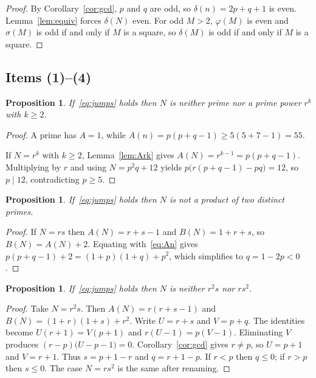 \documentclass[11pt,reqno]{amsart}
\newcommand{\ph}{\varphi}
\newcommand{\sig}{\sigma}
\newtheorem{proposition}[theorem]{Proposition}
\theoremstyle{definition}
\begin{document}
\begin{proof}
By Corollary~\ref{cor:gcd}, \(p\) and \(q\) are odd, so \(\delta(n)=2p+q+1\) is even. Lemma~\ref{lem:equiv} forces \(\delta(N)\) even. For odd \(M>2\), \(\ph(M)\) is even and \(\sig(M)\) is odd if and only if \(M\) is a square, so \(\delta(M)\) is odd if and only if \(M\) is a square.
\end{proof}

\subsection{Items (1)--(4)}

\begin{proposition}
\label{prop:primepower}
If~\eqref{eq:jumps} holds then \(N\) is neither prime nor a prime power \(r^k\) with \(k\ge 2\).
\end{proposition}

\begin{proof}
A prime has \(A=1\), while \(A(n)=p(p+q-1)\ge 5(5+7-1)=55\).

If \(N=r^k\) with \(k\ge 2\), Lemma~\ref{lem:Ark} gives \(A(N)=r^{k-1}=p(p+q-1)\). Multiplying by \(r\) and using \(N=p^2q+12\) yields \(p\bigl(r(p+q-1)-pq\bigr)=12\), so \(p\mid 12\), contradicting \(p\ge 5\).
\end{proof}

\begin{proposition}
\label{prop:rs}
If~\eqref{eq:jumps} holds then \(N\) is not a product of two distinct primes.
\end{proposition}

\begin{proof}
If \(N=rs\) then \(A(N)=r+s-1\) and \(B(N)=1+r+s\), so \(B(N)=A(N)+2\). Equating with~\eqref{eq:An} gives \(p(p+q-1)+2=(1+p)(1+q)+p^2\), which simplifies to \(q=1-2p<0\).
\end{proof}

\begin{proposition}
\label{prop:r2s}
If~\eqref{eq:jumps} holds then \(N\) is neither \(r^2s\) nor \(rs^2\).
\end{proposition}

\begin{proof}
Take \(N=r^2s\). Then \(A(N)=r(r+s-1)\) and \(B(N)=(1+r)(1+s)+r^2\). Write \(U=r+s\) and \(V=p+q\). The identities become \(U(r+1)=V(p+1)\) and \(r(U-1)=p(V-1)\). Eliminating \(V\) produces \((r-p)\bigl(U-p-1\bigr)=0\). Corollary~\ref{cor:gcd} gives \(r\neq p\), so \(U=p+1\) and \(V=r+1\). Thus \(s=p+1-r\) and \(q=r+1-p\). If \(r<p\) then \(q\le 0\); if \(r>p\) then \(s\le 0\). The case \(N=rs^2\) is the same after renaming.
\end{proof}
\end{document}
